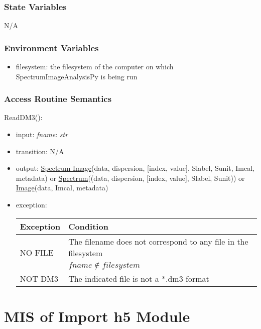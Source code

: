 \documentclass[12pt, titlepage]{article}
\newcommand{\progname}{SpectrumImageAnalysisPy}
\begin{document}
\subsubsection{State Variables}
N/A

\subsubsection{Environment Variables}
\begin{itemize}
    \item filesystem: the filesystem of the computer on which \progname{} is being
    run
\end{itemize}
\subsubsection{Access Routine Semantics}

\noindent ReadDM3():
\begin{itemize}
    \item input: \textit{fname}: \textit{str}
    \item transition: N/A
    \item output: \hyperref[Mod:SI]{Spectrum Image}(data, dispersion, [index,
    value], Slabel, Sunit, Imcal, metadata) or
    \hyperref[Mod:Spectrum]{Spectrum}((data, dispersion, [index, value], Slabel,
    Sunit)) or \hyperref[Mod:Image]{Image}(data, Imcal, metadata)
    \item exception: 
    \begin{center}
        \begin{tabular}{p{3cm} p{12cm}}
            \toprule[0.15em]
            \textbf{Exception} & \textbf{Condition}\\
            \midrule[0.1em]
            \multirow{2}{0.25\textwidth}{NO FILE} & The filename does not correspond
            to any file in the filesystem\\ 
            & $fname \notin filesystem$\\ 
            \midrule[0.05em]
            NOT DM3 & The indicated file is not a *.dm3 format\\
            \bottomrule[0.15em]
        \end{tabular}
    \end{center}
    
\end{itemize}

\newpage
\section{MIS of Import h5 Module} \label{Mod:ImportH5} 
\end{document}
